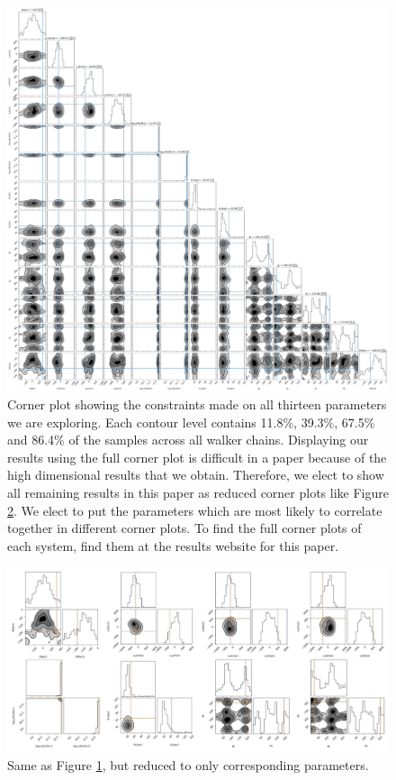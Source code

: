 \begin{figure}
    \centering
    \includegraphics[width=\textwidth]{Chapter1/figures/Arp240-full-corner.pdf}
    \caption{Corner plot showing the constraints made on all thirteen parameters we are exploring. Each contour level contains 11.8\%, 39.3\%, 67.5\% and 86.4\% of the samples across all walker chains. Displaying our results using the full corner plot is difficult in a paper because of the high dimensional results that we obtain. Therefore, we elect to show all remaining results in this paper as reduced corner plots like Figure \ref{fig:arp240_corner_plot}. We elect to put the parameters which are most likely to correlate together in different corner plots. To find the full corner plots of each system, find them at the results website for this paper.}
    \label{fig:corner_plot}
\end{figure}

\begin{figure}
    \centering
    \includegraphics[width=\textwidth]{Chapter1/figures/Arp240-red-corner.pdf}
    \caption{Same as Figure \ref{fig:corner_plot}, but reduced to only corresponding parameters.}
    \label{fig:arp240_corner_plot}
\end{figure}

